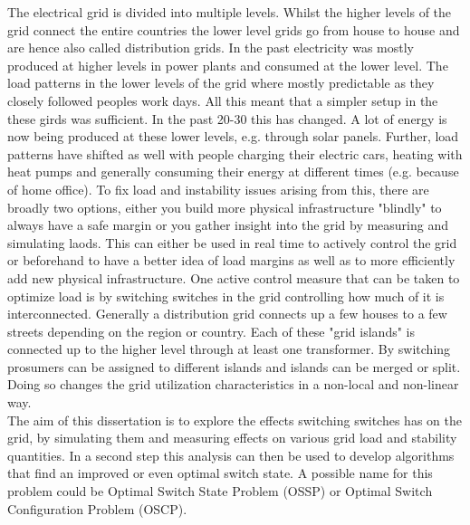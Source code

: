 The electrical grid is divided into multiple levels. Whilst the higher levels of the grid connect
the entire countries the lower level grids go from house to house and are hence also called 
distribution grids. In the past electricity was mostly produced at higher levels in power plants
and consumed at the lower level. The load patterns in the lower levels of the grid where
mostly predictable as they closely followed peoples work days. All this meant that a simpler setup
in the these girds was sufficient. In the past 20-30 this has changed. A lot of energy is now
being produced at these lower levels, e.g. through solar panels. Further, load patterns have shifted
as well with people charging their electric cars, heating with heat pumps and generally consuming
their energy at different times (e.g. because of home office)\autocite{venios}.
To fix load and instability issues arising
from this, there are broadly two options, either you build more physical infrastructure "blindly" to always
have a safe margin or you gather insight into the grid by measuring and simulating laods. This can either
be used in real time to actively control the grid or beforehand to have a better idea of load margins as well
as to more efficiently add new physical infrastructure. One active control measure that can be taken
to optimize load is by switching switches in the grid controlling how much of it is interconnected.
Generally a distribution grid connects up a few houses to a few streets depending on the region or country.
Each of these "grid islands" is connected up to the higher level through at least one transformer. By switching
prosumers can be assigned to different islands and islands can be merged or split. Doing so changes
the grid utilization characteristics in a non-local and non-linear way.\\
The aim of this dissertation is to explore the effects switching switches has on the grid, by simulating them
and measuring effects on various grid load and stability quantities. In a second step this analysis can then be
used to develop algorithms that find an improved or even optimal switch state. A possible name for this problem
could be Optimal Switch State Problem (OSSP) or Optimal Switch Configuration Problem (OSCP).

